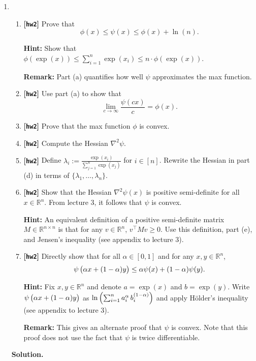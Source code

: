 \documentclass{article}
\def\R{\mathbb{R}}
\def\hw{\textbf{[\texttt{hw2}]}\xspace}
\newcommand{\tildephi}{\psi}
\theoremstyle{definition}
\theoremstyle{remark}
\newenvironment{Q}
{%
\clearpage
\item
}
{%
\phantom{s}%
\bigskip%
\noindent\textbf{Solution.}
}
\begin{document}
\begin{enumerate}[font={\Large\bfseries},leftmargin=0pt]
\begin{Q}
\begin{enumerate}
  \item 
    \hw Prove that  
  \[
  \phi(x) \leq \tildephi(x) \leq \phi(x) + \ln(n).
  \]

  \textbf{Hint: }  Show that 
  $\phi( \exp( x ) ) \leq \sum_{ i = 1}^n \exp(x_i) \leq n \cdot \phi(\exp(x))$.
  
  \textbf{Remark: } Part (a) quantifies how well $\tildephi$ approximates the max function.
  \item 
    \hw Use part (a) to show that 
\[
  \lim_{ c \rightarrow \infty} \frac{\tildephi(c x )}{ c} = \phi(x).
\]
\item 
  \hw Prove that the max function $\phi$ is convex. 

\item 
  \hw Compute the Hessian $\nabla^2 \tildephi$.

\item 
  \hw Define $\lambda_i := \frac{\exp(x_i)}{\sum_{j = 1}^n \exp(x_j)}$ for $i \in [n]$.
Rewrite the Hessian in part (d) in terms of $\{ \lambda_1 ,\dots, \lambda_n\}$.

\item 
  \hw Show that the Hessian $\nabla^2 \tildephi(x)$ is positive semi-definite for all 
$x \in \R^n$. From lecture 3, it follows that $\tildephi$ is convex. 

\textbf{Hint: } An equivalent definition of a positive semi-definite
matrix $M \in \R^{n \times n}$ is that for any $v \in \R^n$, $v^\intercal M v \geq 0$.
Use this definition, part (e), and Jensen's inequality (see appendix to lecture 3).

\item 
  \hw Directly show that  
for all $\alpha \in [0,1]$ and for any $x, y \in \R^n$,
\[
\tildephi \del{ \alpha x + (1 - \alpha)y } \leq \alpha \tildephi(x) + (1 - \alpha) \tildephi(y).
\]

\textbf{Hint: } 
Fix  $x, y \in \R^n$ and denote $a = \exp(x)$ and $b = \exp(y)$. 
Write $\tildephi \del{ \alpha x + (1- \alpha)y }$ as $\ln \del{\sum_{i = 1}^n a_i^\alpha \, b_i^{(1 - \alpha)} }$
and apply H{\"o}lder's inequality (see appendix to lecture 3).


\textbf{Remark: }
  This gives an alternate proof that $\tildephi$ is convex. Note that 
  this proof does not use the fact that $\tildephi$ is twice differentiable.


\end{enumerate}
\end{Q}
\end{enumerate}
\end{document}
